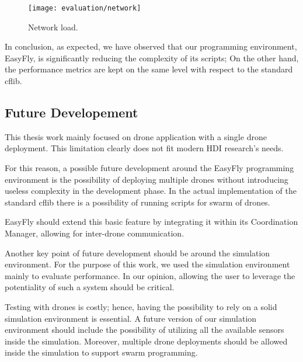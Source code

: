 \begin{figure}[t]
    \centering
    \texttt{[image: evaluation/network]}
    \caption{Network load.}\label{fig:network_load}
\end{figure}

In conclusion, as expected, we have observed that our programming environment, EasyFly, is significantly reducing the complexity of its scripts; 
On the other hand, the performance metrics are kept on the same level with respect to the standard cflib.

\subsection{Future Developement}\label{subsec:future_developement}
This thesis work mainly focused on drone application with a single drone deployment. 
This limitation clearly does not fit modern HDI research's needs. 

For this reason, a possible future development around the EasyFly programming environment is the possibility of deploying multiple drones without introducing useless complexity in the development phase.
In the actual implementation of the standard cflib there is a possibility of running scripts for swarm of drones.

EasyFly should extend this basic feature by integrating it within its Coordination Manager, allowing for inter-drone communication.

Another key point of future development should be around the simulation environment. 
For the purpose of this work, we used the simulation environment mainly to evaluate performance.
In our opinion, allowing the user to leverage the potentiality of such a system should be critical.

Testing with drones is costly; hence, having the possibility to rely on a solid simulation environment is essential.
A future version of our simulation environment should include the possibility of utilizing all the available sensors inside the simulation. 
Moreover, multiple drone deployments should be allowed inside the simulation to support swarm programming.